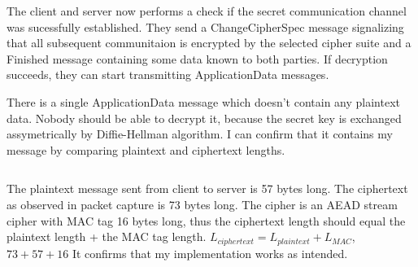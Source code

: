 The client and server now performs a check if the secret communication channel was sucessfully established. They send a ChangeCipherSpec message signalizing that all subsequent communitaion is encrypted by the selected cipher suite and a Finished message containing some data known to both parties. If decryption succeeds, they can start transmitting ApplicationData messages.

There is a single ApplicationData message which doesn't contain any plaintext data. Nobody should be able to decrypt it, because the secret key is exchanged assymetrically by Diffie-Hellman algorithm. I can confirm that it contains my message by comparing plaintext and ciphertext lengths.

\inputminted{text}{code/packet-data.txt}

The plaintext message sent from client to server is 57 bytes long. The ciphertext as observed in packet capture is 73 bytes long. The cipher is an AEAD stream cipher with MAC tag 16 bytes long, thus the ciphertext length should equal the plaintext length + the MAC tag length. $L_{ciphertext} = L_{plaintext} + L_{MAC}$, $73 + 57 + 16$ It confirms that my implementation works as intended.
